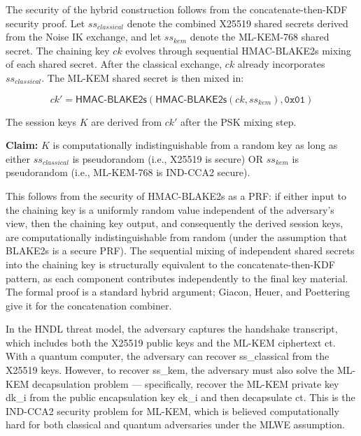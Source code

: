 The security of the hybrid construction follows from the concatenate-then-KDF security proof. Let $\mathit{ss}_\mathit{classical}$ denote the combined X25519 shared secrets derived from the Noise IK exchange, and let $\mathit{ss}_\mathit{kem}$ denote the ML-KEM-768 shared secret. The chaining key $\mathit{ck}$ evolves through sequential HMAC-BLAKE2s mixing of each shared secret. After the classical exchange, $\mathit{ck}$ already incorporates $\mathit{ss}_\mathit{classical}$. The ML-KEM shared secret is then mixed in:

\begin{equation}
\mathit{ck}' = \mathsf{HMAC\text{-}BLAKE2s}(\mathsf{HMAC\text{-}BLAKE2s}(\mathit{ck}, \mathit{ss}_\mathit{kem}), \mathtt{0x01})
\end{equation}

The session keys $K$ are derived from $\mathit{ck}'$ after the PSK mixing step.

\textbf{Claim:} $K$ is computationally indistinguishable from a random key as long as either $\mathit{ss}_\mathit{classical}$ is pseudorandom (i.e., X25519 is secure) OR $\mathit{ss}_\mathit{kem}$ is pseudorandom (i.e., ML-KEM-768 is IND-CCA2 secure).

This follows from the security of HMAC-BLAKE2s as a PRF: if either input to the chaining key is a uniformly random value independent of the adversary's view, then the chaining key output, and consequently the derived session keys, are computationally indistinguishable from random (under the assumption that BLAKE2s is a secure PRF). The sequential mixing of independent shared secrets into the chaining key is structurally equivalent to the concatenate-then-KDF pattern, as each component contributes independently to the final key material. The formal proof is a standard hybrid argument; Giacon, Heuer, and Poettering~\cite{giacon2018combiners} give it for the concatenation combiner.

In the HNDL threat model, the adversary captures the handshake transcript, which includes both the X25519 public keys and the ML-KEM ciphertext ct. With a quantum computer, the adversary can recover ss\_classical from the X25519 keys. However, to recover ss\_kem, the adversary must also solve the ML-KEM decapsulation problem — specifically, recover the ML-KEM private key dk\_i from the public encapsulation key ek\_i and then decapsulate ct. This is the IND-CCA2 security problem for ML-KEM, which is believed computationally hard for both classical and quantum adversaries under the MLWE assumption.

